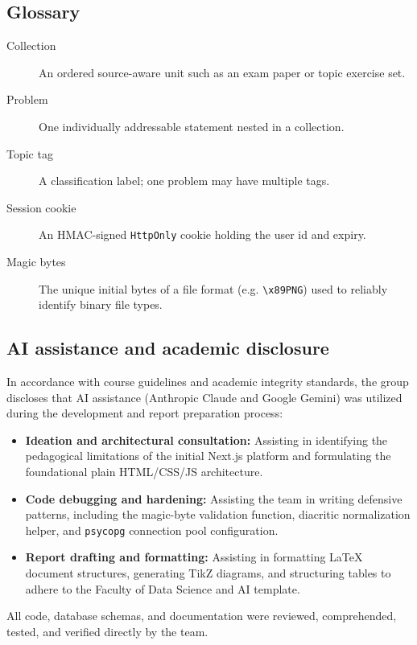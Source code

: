\subsection{Glossary}
\begin{description}
  \item[Collection] An ordered source-aware unit such as an exam paper or topic exercise set.
  \item[Problem] One individually addressable statement nested in a collection.
  \item[Topic tag] A classification label; one problem may have multiple tags.
  \item[Session cookie] An HMAC-signed \texttt{HttpOnly} cookie holding the user id and expiry.
  \item[Magic bytes] The unique initial bytes of a file format (e.g. \texttt{\textbackslash x89PNG}) used to reliably identify binary file types.
\end{description}

\subsection{AI assistance and academic disclosure}
In accordance with course guidelines and academic integrity standards, the group discloses that
AI assistance (Anthropic Claude and Google Gemini) was utilized during the development and report
preparation process:
\begin{itemize}
  \item \textbf{Ideation and architectural consultation:} Assisting in identifying the pedagogical limitations
        of the initial Next.js platform and formulating the foundational plain HTML/CSS/JS architecture.
  \item \textbf{Code debugging and hardening:} Assisting the team in writing defensive patterns, including the
        magic-byte validation function, diacritic normalization helper, and \texttt{psycopg} connection pool configuration.
  \item \textbf{Report drafting and formatting:} Assisting in formatting LaTeX document structures, generating
        TikZ diagrams, and structuring tables to adhere to the Faculty of Data Science and AI template.
\end{itemize}
All code, database schemas, and documentation were reviewed, comprehended, tested, and verified directly by the team.
